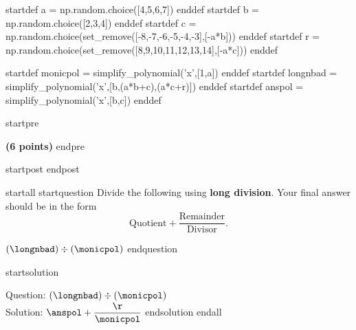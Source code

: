 startdef a = np.random.choice([4,5,6,7]) enddef
startdef b = np.random.choice([2,3,4]) enddef
startdef c = np.random.choice(set_remove([-8,-7,-6,-5,-4,-3],[-a*b])) enddef
startdef r = np.random.choice(set_remove([8,9,10,11,12,13,14],[-a*c])) enddef

startdef monicpol = simplify_polynomial('x',[1,a]) enddef
startdef longnbad = simplify_polynomial('x',[b,(a*b+c),(a*c+r)]) enddef
startdef anspol = simplify_polynomial('x',[b,c]) enddef


startpre \item {\bf (6 points)} endpre

startpost
\vfill  \vfill \vfill
endpost


startall
startquestion Divide the following using {\bf long division}. Your final answer should be in the form $$ \text{Quotient} + \dfrac{\text{Remainder}}{\text{Divisor}}.$$

\vspace{3mm}

$(\longnbad) \div (\monicpol)$
endquestion 

startsolution
\item Question: $(\longnbad) \div (\monicpol)$   \\
Solution: $\anspol + \dfrac{\r}{\monicpol}$
endsolution
endall


